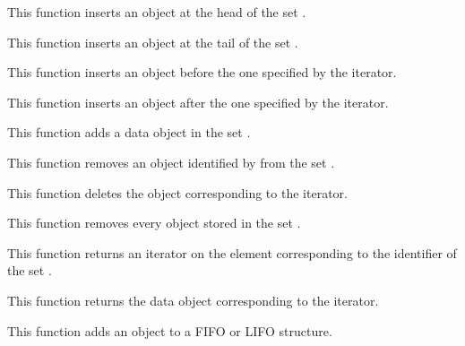 	 {
	   This function inserts an object at the head of the set
	   .
	 }

	 {
	   This function inserts an object at the tail of the set
	   .
	 }

	 {
	   This function inserts an object before the one specified
	   by the iterator.
	 }

	 {
	   This function inserts an object after the one specified
	   by the iterator.
	 }

	 {
	   This function adds a data object in the set .
	 }

	 {
	   This function removes an object identified by 
	   from the set .
	 }

	 {
	   This function deletes the object corresponding to the iterator.
	 }

	 {
	   This function removes every object stored in the set
	   .
	 }

	 {
	   This function returns an iterator on the element corresponding
	   to the identifier  of the set .
	 }

	 {
	   This function returns the data object corresponding to
	   the iterator.
	 }

	 {
	   This function adds an object to a FIFO or LIFO structure.
	 }


